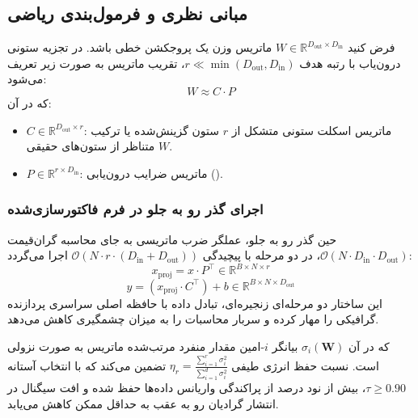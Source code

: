 \subsection{مبانی نظری و فرمول‌بندی ریاضی}
فرض کنید $W \in \mathbb{R}^{D_{\text{out}} \times D_{\text{in}}}$ ماتریس وزن یک پروجکشن خطی باشد. در تجزیه ستونی درون‌یاب با رتبه هدف $r \ll \min(D_{\text{out}}, D_{\text{in}})$، تقریب ماتریس به صورت زیر تعریف می‌شود:
\begin{equation}
W \approx C \cdot P
\end{equation}
که در آن:
\begin{itemize}
    \item $C \in \mathbb{R}^{D_{\text{out}} \times r}$: ماتریس اسکلت ستونی متشکل از $r$ ستون گزینش‌شده یا ترکیب متناظر از ستون‌های حقیقی $W$.
    \item $P \in \mathbb{R}^{r \times D_{\text{in}}}$: ماتریس ضرایب درون‌یابی ().
\end{itemize}

\subsubsection*{اجرای گذر رو به جلو در فرم فاکتورسازی‌شده}
حین گذر رو به جلو، عملگر ضرب ماتریسی به جای محاسبه گران‌قیمت $\mathcal{O}(N \cdot D_{\text{in}} \cdot D_{\text{out}})$، در دو مرحله با پیچیدگی $\mathcal{O}(N \cdot r \cdot (D_{\text{in}} + D_{\text{out}}))$ اجرا می‌گردد:
\begin{equation}
x_{\text{proj}} = x \cdot P^\top \in \mathbb{R}^{B \times N \times r}
\end{equation}
\begin{equation}
y = (x_{\text{proj}} \cdot C^\top) + b \in \mathbb{R}^{B \times N \times D_{\text{out}}}
\end{equation}
این ساختار دو مرحله‌ای زنجیره‌ای، تبادل داده با حافظه اصلی سراسری پردازنده گرافیکی را مهار کرده و سربار محاسبات را به میزان چشمگیری کاهش می‌دهد.

که در آن $\sigma_i(\mathbf{W})$ بیانگر $i$-امین مقدار منفرد مرتب‌شده ماتریس به صورت نزولی است. نسبت حفظ انرژی طیفی $\eta_r = \frac{\sum_{i=1}^r \sigma_i^2}{\sum_{i=1}^{d} \sigma_i^2}$ تضمین می‌کند که با انتخاب آستانه $\tau \ge 0.90$، بیش از نود درصد از پراکندگی واریانس داده‌ها حفظ شده و افت سیگنال در انتشار گرادیان رو به عقب به حداقل ممکن کاهش می‌یابد.

